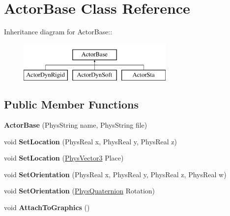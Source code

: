 \hypertarget{classActorBase}{
\section{ActorBase Class Reference}
\label{dd/d7b/classActorBase}
}
Inheritance diagram for ActorBase::\begin{figure}[H]
\begin{center}
\leavevmode
\includegraphics[height=2cm]{dd/d7b/classActorBase}
\end{center}
\end{figure}
\subsection*{Public Member Functions}
\begin{DoxyCompactItemize}
\item 
\hypertarget{classActorBase_aa69b59aa7a71b16549907adfcd4c1858}{
{\bfseries ActorBase} (PhysString name, PhysString file)}
\label{dd/d7b/classActorBase_aa69b59aa7a71b16549907adfcd4c1858}

\item 
\hypertarget{classActorBase_a34848d620c5d9d2796999edbdcb77c9a}{
void {\bfseries SetLocation} (PhysReal x, PhysReal y, PhysReal z)}
\label{dd/d7b/classActorBase_a34848d620c5d9d2796999edbdcb77c9a}

\item 
\hypertarget{classActorBase_a2a204add0b036de441ebd59d14939000}{
void {\bfseries SetLocation} (\hyperlink{classPhysVector3}{PhysVector3} Place)}
\label{dd/d7b/classActorBase_a2a204add0b036de441ebd59d14939000}

\item 
\hypertarget{classActorBase_a9777506815a9840552b30c65d5d70f8d}{
void {\bfseries SetOrientation} (PhysReal x, PhysReal y, PhysReal z, PhysReal w)}
\label{dd/d7b/classActorBase_a9777506815a9840552b30c65d5d70f8d}

\item 
\hypertarget{classActorBase_a5fe558ca0a88061615cda52a4dc5bf66}{
void {\bfseries SetOrientation} (\hyperlink{classPhysQuaternion}{PhysQuaternion} Rotation)}
\label{dd/d7b/classActorBase_a5fe558ca0a88061615cda52a4dc5bf66}

\item 
\hypertarget{classActorBase_afab604970fede16ccde0c6b8e72d9ee0}{
void {\bfseries AttachToGraphics} ()}
\label{dd/d7b/classActorBase_afab604970fede16ccde0c6b8e72d9ee0}

\end{DoxyCompactItemize}
